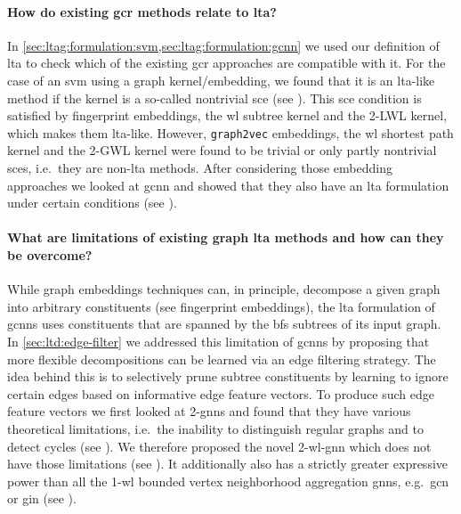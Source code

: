 \paragraph{\; How do existing \ac{gcr} methods relate to \ac{lta}?}
In \cref{sec:ltag:formulation:svm,sec:ltag:formulation:gcnn} we used our definition of \ac{lta} to check which of the existing \ac{gcr} approaches are compatible with it.
For the case of an \ac{svm} using a graph kernel/embedding, we found that it is an \acs{lta}-like method if the kernel is a so-called nontrivial \acf{sce} (see ).
This \ac{sce} condition is satisfied by fingerprint embeddings, the \ac{wl} subtree kernel and the 2-LWL kernel, which makes them \acs{lta}-like.
However, \texttt{graph2vec} embeddings, the \ac{wl} shortest path kernel and the 2-GWL kernel were found to be trivial or only partly nontrivial \acp{sce}, i.e.\ they are non-\acs{lta} methods.
After considering those embedding approaches we looked at \ac{gcnn} and showed that they also have an \ac{lta} formulation under certain conditions (see ).

\paragraph{\; What are limitations of existing graph \ac{lta} methods and how can they be overcome?}
While graph embeddings techniques can, in principle, decompose a given graph into arbitrary constituents (see fingerprint embeddings), the \ac{lta} formulation of \acp{gcnn} uses constituents that are spanned by the \ac{bfs} subtrees of its input graph.
In \cref{sec:ltd:edge-filter} we addressed this limitation of \acp{gcnn} by proposing that more flexible decompositions can be learned via an edge filtering strategy.
The idea behind this is to selectively prune subtree constituents by learning to ignore certain edges based on informative edge feature vectors.
To produce such edge feature vectors we first looked at 2-\acsp{gnn} and found that they have various theoretical limitations, i.e.\ the inability to distinguish regular graphs and to detect cycles (see ).
We therefore proposed the novel 2-\acs{wl}-\acs{gnn} which does not have those limitations (see ).
It additionally also has a strictly greater expressive power than all the 1-\acs{wl} bounded vertex neighborhood aggregation \acp{gnn}, e.g.\ \ac{gcn} or \ac{gin} (see ).

